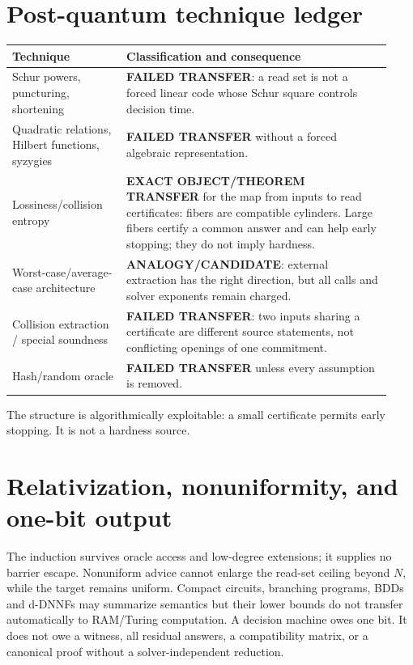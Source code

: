 \documentclass[11pt]{article}
\begin{document}
\section{Post-quantum technique ledger}
\begin{longtable}{p{0.28\linewidth}p{0.65\linewidth}}
\toprule Technique & Classification and consequence\\ \midrule\endhead
Schur powers, puncturing, shortening & \textbf{FAILED TRANSFER}: a read set is
not a forced linear code whose Schur square controls decision time.\\
Quadratic relations, Hilbert functions, syzygies & \textbf{FAILED TRANSFER}
without a forced algebraic representation.\\
Lossiness/collision entropy & \textbf{EXACT OBJECT/THEOREM TRANSFER} for the
map from inputs to read certificates: fibers are compatible cylinders.  Large
fibers certify a common answer and can help early stopping; they do not imply
hardness.\\
Worst-case/average-case architecture & \textbf{ANALOGY/CANDIDATE}: external
extraction has the right direction, but all calls and solver exponents remain
charged.\\
Collision extraction / special soundness & \textbf{FAILED TRANSFER}: two
inputs sharing a certificate are different source statements, not conflicting
openings of one commitment.\\
Hash/random oracle & \textbf{FAILED TRANSFER} unless every assumption is
removed.\\ \bottomrule
\end{longtable}

The structure is algorithmically exploitable: a small certificate permits
early stopping.  It is not a hardness source.

\section{Relativization, nonuniformity, and one-bit output}
The induction survives oracle access and low-degree extensions; it supplies no
barrier escape.  Nonuniform advice cannot enlarge the read-set ceiling beyond
\(N\), while the target remains uniform.  Compact circuits, branching programs,
BDDs and d-DNNFs may summarize semantics but their lower bounds do not transfer
automatically to RAM/Turing computation.  A decision machine owes one bit.  It
does not owe a witness, all residual answers, a compatibility matrix, or a
canonical proof without a solver-independent reduction.
\end{document}
